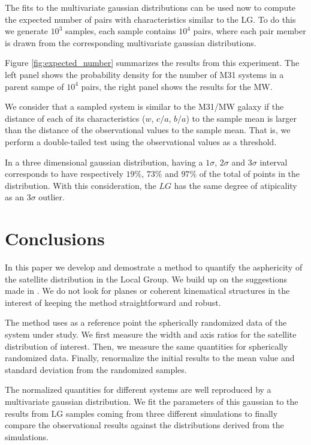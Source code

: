 \documentclass[a4paper,fleqn,usenatbib]{mnras}
\begin{document}
The fits to the multivariate gaussian distributions can be used now to
compute the expected number of pairs with characteristics similar to
the LG.
To do this we generate $10^3$ samples, each sample contains $10^4$
pairs, where each pair member is drawn from the corresponding
multivariate gaussian distributions.  

Figure \ref{fig:expected_number} summarizes the results from this
experiment. 
The left panel shows the probability density for the number of M31
systems in a parent sampe of $10^4$ pairs, the right panel shows the
results for the MW.

We consider that a sampled system is similar to the M31/MW galaxy if the
distance of each of its characteristics ($w$, $c/a$, $b/a$) to the
sample mean is larger than the distance of the observational values to
the sample mean. 
That is, we perform a double-tailed test using the observational
values as a threshold. 

In a three dimensional gaussian distribution, having a $1\sigma$,
$2\sigma$ and $3\sigma$ interval corresponds to have respectively $19 \%$, $73 \%$ and
$97 \%$ of the total of points in the distribution.
With this consideration, the $LG$ has the same degree of atipicality
as an $3\sigma$ outlier.



\section{Conclusions}

In this paper we develop and demostrate a method to quantify the
asphericity of the satellite distribution in the Local Group.
We build up on the suggestions made in \cite{XX}.
We do not look for planes or coherent kinematical structures in the
interest of keeping the method straightforward and robust.

The method uses as a reference point the spherically randomized data
of the system under study.
We first measure the width and axis ratios for the satellite
distribution of interest. 
Then, we measure the same quantities for spherically
randomized data. 
Finally, renormalize the initial results to the mean value and
standard deviation from the randomized samples.  

The normalized quantities for different systems are well reproduced by
a multivariate gaussian distribution. 
We fit the parameters of this gaussian to the results from 
LG samples coming from three different simulations
to finally compare the observational results against the distributions
derived from the simulations.
\end{document}
